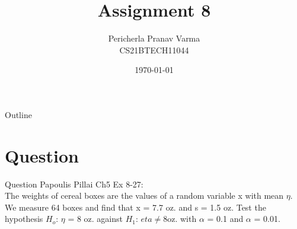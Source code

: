 \documentclass{beamer}
\title{Assignment 8}
\author{Pericherla Pranav Varma\\CS21BTECH11044}
\date{\today}
\begin{document}
    \begin{frame}
        \titlepage 
    \end{frame}

    \begin{frame}{Outline}
        \tableofcontents
    \end{frame}

    \section{Question}
    	\begin{frame}{Question}
    	Papoulis Pillai Ch5 Ex 8-27:\\[9pt]
    The weights of cereal boxes are the values of a random variable x with mean $\eta$. We measure
64 boxes and find that x = 7.7 oz. and s = 1.5 oz. Test the hypothesis $H_o$: $\eta$ = 8 oz. against
$H_1$: $eta \neq 8$oz. with $\alpha$ = 0.1 and $\alpha$ = 0.01.
    	\end{frame}
%    
\end{document}
